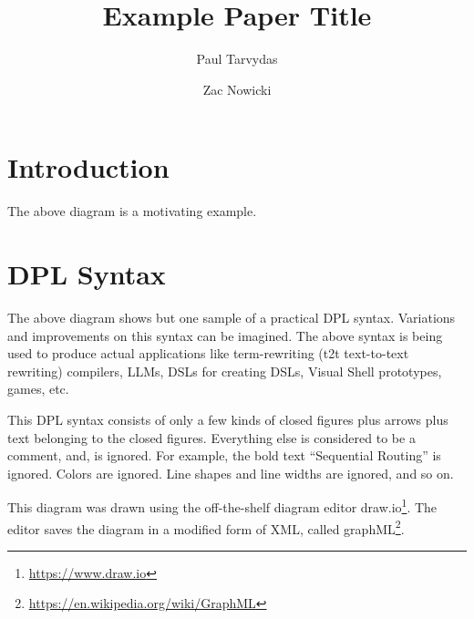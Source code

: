 \documentclass{acmart}
\title{Example Paper Title}
\author{Paul Tarvydas}
\affiliation{%
  \institution{Institution1}
  \streetaddress{Street1}
  \city{City1}
  \state{State1}
  \country{Country1}
  \postcode{Zip1}
}
\author{Zac Nowicki}
\affiliation{%
  \institution{Institution2}
  \streetaddress{Street2}
  \city{City2}
  \state{State2}
  \country{Country2}
  \postcode{Zip2}
}
\begin{document}
\maketitle

\section{Introduction}
The above diagram is a motivating example.

\section{DPL Syntax}
The above diagram shows but one sample of a practical DPL syntax. Variations and improvements on this syntax can be imagined. The above syntax is being used to produce actual applications like term-rewriting (t2t text-to-text rewriting) compilers, LLMs, DSLs for creating DSLs, Visual Shell prototypes, games, etc.

This DPL syntax consists of only a few kinds of closed figures plus arrows plus text belonging to the closed figures. Everything else is considered to be a comment, and, is ignored. For example, the bold text ``Sequential Routing'' is ignored. Colors are ignored. Line shapes and line widths are ignored, and so on.

This diagram was drawn using the off-the-shelf diagram editor draw.io\footnote{\url{https://www.draw.io}}. The editor saves the diagram in a modified form of XML, called graphML\footnote{\url{https://en.wikipedia.org/wiki/GraphML}}.
\end{document}
